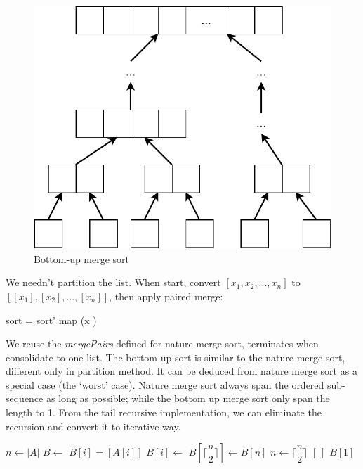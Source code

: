 \documentclass[b5paper]{article}
\begin{document}
\begin{figure}[htbp]
 \centering
 \includegraphics[scale=0.6]{img/bottom-up-msort}
 \caption{Bottom-up merge sort}
 \label{fig:bottom-up-msort}
\end{figure}

We needn't partition the list. When start, convert $[x_1, x_2, ..., x_n]$ to $[[x_1], [x_2], ..., [x_n]]$, then apply paired merge:

\be
sort = sort' \circ map (x \mapsto [x])
\ee

We reuse the \textit{mergePairs} defined for nature merge sort, terminates when consolidate to one list\cite{okasaki-book}. The bottom up sort is similar to the nature merge sort, different only in partition method. It can be deduced from nature merge sort as a special case (the `worst' case). Nature merge sort always span the ordered sub-sequence as long as possible; while the bottom up merge sort only span the length to 1. From the tail recursive implementation, we can eliminate the recursion and convert it to iterative way.

\begin{algorithmic}[1]
  \State $n \gets |A|$
  \State $B \gets $ 
    \State $B[i] = [A[i]]$
  \EndFor
      \State $B[i] \gets$ 
    \EndFor
      \State $B[\lceil \dfrac{n}{2} \rceil] \gets B[n]$
    \EndIf
    \State $n \gets \lceil \dfrac{n}{2} \rceil$
  \EndWhile
    \State \Return $[\ ]$
  \EndIf
  \State \Return $B[1]$
\EndFunction
\end{algorithmic}
\end{document}
